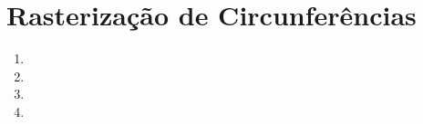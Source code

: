 \section*{Rasterização de Circunferências}

	\begin{enumerate} \addtocounter{enumi}{15}
		\item 
		
		\item 

		\item 

		\item 

	\end{enumerate}
